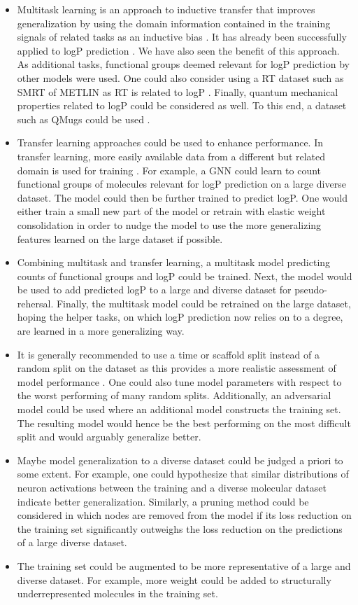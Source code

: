 \documentclass{article}
\theoremstyle{definition}
\theoremstyle{remark}
\begin{document}
\begin{itemize}
\item Multitask learning is an approach to inductive transfer that improves generalization by using the domain information contained in the training signals of related tasks as an inductive bias \cite{caruana1997multitask}. It has already been successfully applied to logP prediction \cite{lenselink2021multitask}. We have also seen the benefit of this approach. As additional tasks, functional groups deemed relevant for logP prediction by other models were used. One could also consider using a RT dataset such as SMRT of METLIN as RT is related to logP \cite{domingo2019metlin}. Finally, quantum mechanical properties related to logP could be considered as well. To this end, a dataset such as QMugs could be used \cite{isert2022qmugs}.
\item Transfer learning approaches could be used to enhance performance. In transfer learning, more easily available data from a different but related domain is used for training \cite{weiss2016survey}. For example, a GNN could learn to count functional groups of molecules relevant for logP prediction on a large diverse dataset. The model could then be further trained to predict logP. One would either train a small new part of the model or retrain with elastic weight consolidation in order to nudge the model to use the more generalizing features learned on the large dataset if possible.
\item Combining multitask and transfer learning, a multitask model predicting counts of functional groups and logP could be trained. Next, the model would be used to add predicted logP to a large and diverse dataset for pseudo-rehersal. Finally, the multitask model could be retrained on the large dataset, hoping the helper tasks, on which logP prediction now relies on to a degree, are learned in a more generalizing way.
\item It is generally recommended to use a time or scaffold split instead of a random split on the dataset as this provides a more realistic assessment of model performance \cite{lenselink2021multitask}. One could also tune model parameters with respect to the worst performing of many random splits. Additionally, an adversarial model could be used where an additional model constructs the training set. The resulting model would hence be the best performing on the most difficult split and would arguably generalize better.
\item Maybe model generalization to a diverse dataset could be judged a priori to some extent. For example, one could hypothesize that similar distributions of neuron activations between the training and a diverse molecular dataset indicate better generalization. Similarly, a pruning method could be considered in which nodes are removed from the model if its loss reduction on the training set significantly outweighs the loss reduction on the predictions of a large diverse dataset.
\item The training set could be augmented to be more representative of a large and diverse dataset. For example, more weight could be added to structurally underrepresented molecules in the training set.
\end{itemize}
\end{document}
